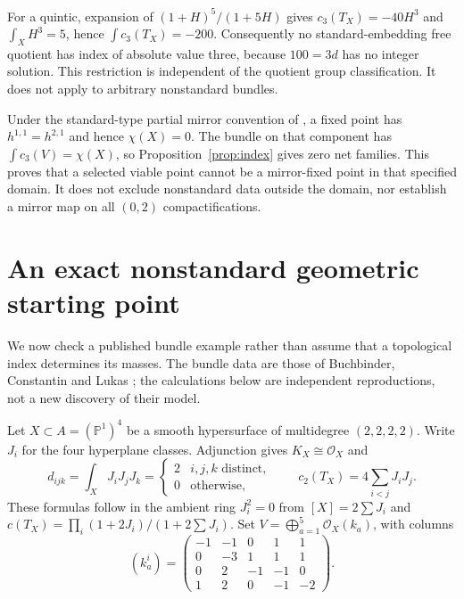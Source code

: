 For a quintic, expansion of $(1+H)^5/(1+5H)$ gives
$c_3(T_X)=-40H^3$ and $\int_XH^3=5$, hence $\int c_3(T_X)=-200$.
Consequently no standard-embedding
free quotient has index of absolute value three, because $100=3d$ has no
integer solution. This restriction is independent of the quotient group
classification. It does not apply to arbitrary nonstandard bundles.

Under the standard-type partial mirror convention of \cite{Mirror}, a
fixed point has $h^{1,1}=h^{2,1}$ and hence $\chi(X)=0$. The bundle on
that component has $\int c_3(V)=\chi(X)$, so Proposition~\ref{prop:index}
gives zero net families. This proves that a selected viable point cannot
be a mirror-fixed point in that specified domain. It does not exclude
nonstandard data outside the domain, nor establish a mirror map on all
$(0,2)$ compactifications.

\section{An exact nonstandard geometric starting point}
We now check a published bundle example rather than assume that a
topological index determines its masses. The bundle data are those of
Buchbinder, Constantin and Lukas \cite[Sec.~5.1]{BCL}; the calculations
below are independent reproductions, not a new discovery of their model.

Let $X\subset A=(\mathbb P^1)^4$ be a smooth hypersurface of multidegree
$(2,2,2,2)$. Write $J_i$ for the four hyperplane classes. Adjunction gives
$K_X\cong\mathcal O_X$ and
\[
 d_{ijk}=\int_XJ_iJ_jJ_k=
 \begin{cases}2& i,j,k\text{ distinct},\\0&\text{otherwise},\end{cases}
 \qquad c_2(T_X)=4\sum_{i<j}J_iJ_j.
\]
These formulas follow in the ambient ring $J_i^2=0$ from
$[X]=2\sum J_i$ and $c(T_X)=\prod_i(1+2J_i)/(1+2\sum J_i)$.
Set $V=\bigoplus_{a=1}^5\mathcal O_X(k_a)$, with columns
\begin{equation}\label{eq:bundle}
(k_a^i)=
\begin{pmatrix}
-1&-1&0&1&1\\
0&-3&1&1&1\\
0&2&-1&-1&0\\
1&2&0&-1&-2
\end{pmatrix}.
\end{equation}

